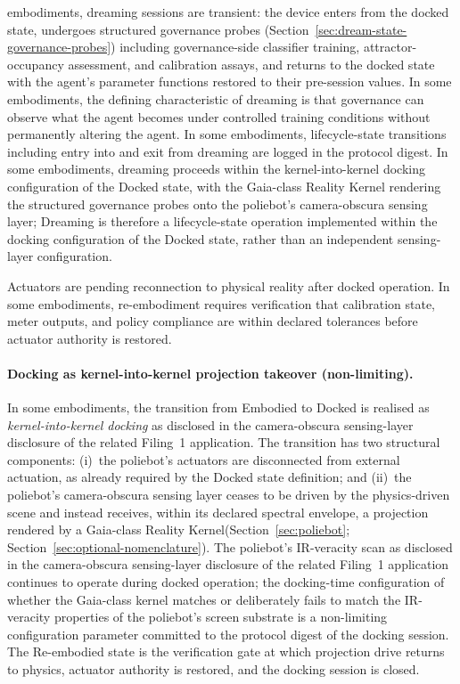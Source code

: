 \documentclass[a4paper,12pt]{article}
\newcommand{\RK}{Reality Kernel\xspace}
\begin{document}
\begin{description}
    embodiments, dreaming sessions are transient: the device enters
    from the docked state, undergoes structured governance probes
    (Section~\ref{sec:dream-state-governance-probes}) including
    governance-side classifier training, attractor-occupancy
    assessment, and calibration assays, and returns to the docked
    state with the agent's parameter functions restored to their
    pre-session values. In some embodiments, the defining
    characteristic of dreaming is that governance can observe what
    the agent becomes under controlled training conditions without
    permanently altering the agent. In some embodiments, lifecycle-state
    transitions including entry into and exit from dreaming are logged
    in the protocol digest. In some embodiments, dreaming proceeds
    within the kernel-into-kernel docking configuration of the Docked
    state, with the Gaia-class \RK rendering the structured
    governance probes onto the poliebot's camera-obscura sensing
    layer; Dreaming is therefore a lifecycle-state operation
    implemented within the docking configuration of the Docked state,
    rather than an independent sensing-layer configuration.
  \item[Re-embodied.] Actuators are pending reconnection to physical
    reality after docked operation. In some embodiments, re-embodiment
    requires verification that calibration state, meter outputs, and
    policy compliance are within declared tolerances before actuator
    authority is restored.
\end{description}

\paragraph{Docking as kernel-into-kernel projection takeover
(non-limiting).}
In some embodiments, the transition from Embodied to Docked is
realised as \emph{kernel-into-kernel docking} as disclosed in
the camera-obscura sensing-layer disclosure of the related Filing~1 application. The transition has two structural
components: (i)~the poliebot's actuators are disconnected from
external actuation, as already required by the Docked state
definition; and (ii)~the poliebot's camera-obscura sensing layer
ceases to be driven by the physics-driven scene and instead receives,
within its declared spectral envelope, a projection rendered by a
Gaia-class \RK (Section~\ref{sec:poliebot};
Section~\ref{sec:optional-nomenclature}). The poliebot's IR-veracity
scan as disclosed in the camera-obscura sensing-layer disclosure of the related Filing~1 application continues to
operate during docked operation; the docking-time configuration of
whether the Gaia-class kernel matches or deliberately fails to match
the IR-veracity properties of the poliebot's screen substrate is a
non-limiting configuration parameter committed to the protocol digest
of the docking session. The Re-embodied state is the verification
gate at which projection drive returns to physics, actuator
authority is restored, and the docking session is closed.
\end{document}
